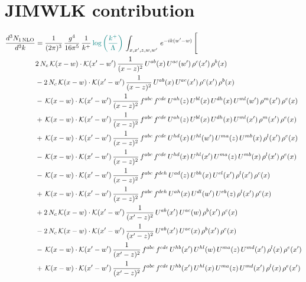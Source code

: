 \documentclass[9pt]{article}
\numberwithin{equation}{section}
\begin{document}
\section{JIMWLK contribution}
\begin{align}
\frac{d^{3}N_{1\,\mathrm{NLO}}}{d^{3}k} & = \frac{1}{(2\pi)^{3}}\,\frac{g^{4}}{16\pi^{5}}\,\frac{1}{k^{+}}\,{\color{teal}\log{\left(\frac{k^{+}}{\Lambda}\right)}}\,\int_{x,x',z,w,w'}\,e^{-ik(w'-w)}\,\Bigg[\notag\\
&2\,N_{c}\,\mathcal{K}(x-w)\cdot\mathcal{K}(x'-w')\,\frac{1}{(x-z)^{2}}\,U^{ab}(x)\,U^{ac}(w')\,\rho^{c}(x')\,\rho^{b}(x)\notag\\
&-2\,N_{c}\,\mathcal{K}(x-w)\cdot\mathcal{K}(x'-w')\,\frac{1}{(x-z)^{2}}\,U^{ab}(x)\,U^{ac}(x')\,\rho^{c}(x')\,\rho^{b}(x)\notag\\
&-\,\mathcal{K}(x-w)\cdot\mathcal{K}(x'-w')\,\frac{1}{(x-z)^{2}}\,f^{abc}\,f^{cde}\,U^{ah}(z)\,U^{bl}(x)\,U^{dh}(x)\,U^{ml}(w')\,\rho^{m}(x')\,\rho^{e}(x)\notag\\
&+\,\mathcal{K}(x-w)\cdot\mathcal{K}(x'-w')\,\frac{1}{(x-z)^{2}}\,f^{abc}\,f^{cde}\,U^{ah}(z)\,U^{bl}(x)\,U^{dh}(x)\,U^{ml}(x')\,\rho^{m}(x')\,\rho^{e}(x)\notag\\
&+\,\mathcal{K}(x-w)\cdot\mathcal{K}(x'-w')\,\frac{1}{(x-z)^{2}}\,f^{abc}\,f^{cde}\,U^{hd}(x)\,U^{hl}(w')\,U^{ma}(z)\,U^{mb}(x)\,\rho^{l}(x')\,\rho^{e}(x)\notag\\
&-\,\mathcal{K}(x-w)\cdot\mathcal{K}(x'-w')\,\frac{1}{(x-z)^{2}}\,f^{abc}\,f^{cde}\,U^{hd}(x)\,U^{hl}(x')\,U^{ma}(z)\,U^{mb}(x)\,\rho^{l}(x')\,\rho^{e}(x)\notag\\
&-\,\mathcal{K}(x-w)\cdot\mathcal{K}(x'-w')\,\frac{1}{(x-z)^{2}}\,f^{abc}\,f^{deh}\,U^{ad}(z)\,U^{bh}(x)\,U^{el}(x')\,\rho^{l}(x')\,\rho^{c}(x)\notag\\
&+\,\mathcal{K}(x-w)\cdot\mathcal{K}(x'-w')\,\frac{1}{(x-z)^{2}}\,f^{abc}\,f^{deh}\,U^{ah}(x)\,U^{dl}(w')\,U^{eb}(z)\,\rho^{l}(x')\,\rho^{c}(x)\notag\\
&+2\,N_{c}\,\mathcal{K}(x-w)\cdot\mathcal{K}(x'-w')\,\frac{1}{(x'-z)^{2}}\,U^{ab}(x')\,U^{ac}(w)\,\rho^{b}(x')\,\rho^{c}(x)\notag\\
&-2\,N_{c}\,\mathcal{K}(x-w)\cdot\mathcal{K}(x'-w')\,\frac{1}{(x'-z)^{2}}\,U^{ab}(x')\,U^{ac}(x)\,\rho^{b}(x')\,\rho^{c}(x)\notag\\
&-\,\mathcal{K}(x-w)\cdot\mathcal{K}(x'-w')\,\frac{1}{(x'-z)^{2}}\,f^{abc}\,f^{cde}\,U^{hb}(x')\,U^{hl}(w)\,U^{ma}(z)\,U^{md}(x')\,\rho^{l}(x)\,\rho^{e}(x')\notag\\
&+\,\mathcal{K}(x-w)\cdot\mathcal{K}(x'-w')\,\frac{1}{(x'-z)^{2}}\,f^{abc}\,f^{cde}\,U^{hb}(x')\,U^{hl}(x)\,U^{ma}(z)\,U^{md}(x')\,\rho^{l}(x)\,\rho^{e}(x')\notag\\

\end{align}
\end{document}
